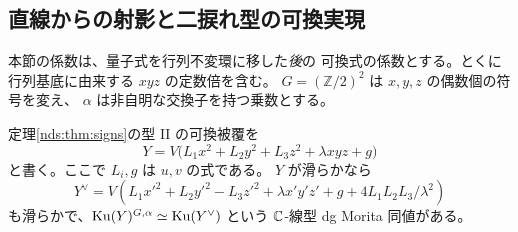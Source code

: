 \subsection{直線からの射影と二捩れ型の可換実現}
\label{ndc:sec:dual}
本節の係数は、量子式を行列不変環に移した\emph{後}の
可換式の係数とする。とくに行列基底に由来する $xyz$ の定数倍を含む。
$G=(\mathbb Z/2)^2$ は $x,y,z$ の偶数個の符号を変え、
$\alpha$ は非自明な交換子を持つ乗数とする。
\begin{theorem}\label{ndc:thm:dual}
定理\ref{nds:thm:signs}の型 II の可換被覆を
\[
 Y=V\bigl(L_1x^2+L_2y^2+L_3z^2+\lambda xyz+g\bigr)
\]
と書く。ここで $L_i,g$ は $u,v$ の式である。
$Y$ が滑らかなら
\[
 Y^\vee=V\left(L_1x'^2+L_2y'^2-L_3z'^2
                  +\lambda x'y'z'+g+4L_1L_2L_3/\lambda^2\right)
\]
も滑らかで、$\operatorname{Ku}(Y)^{G,\alpha}\simeq\operatorname{Ku}(Y^\vee)$ という
$\mathbb C$-線型 dg Morita 同値がある。
\end{theorem}
